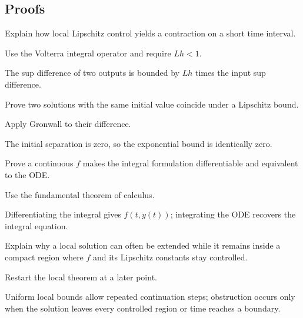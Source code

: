 \subsection*{Proofs}

\begin{exercise}\label{exr:ii19-expand-06}
Explain how local Lipschitz control yields a contraction on a short time interval.
\end{exercise}
\begin{hint}
Use the Volterra integral operator and require \(Lh<1\).
\end{hint}
\begin{solution}
The sup difference of two outputs is bounded by \(Lh\) times the input sup difference.
\end{solution}

\begin{exercise}\label{exr:ii19-expand-07}
Prove two solutions with the same initial value coincide under a Lipschitz bound.
\end{exercise}
\begin{hint}
Apply Gronwall to their difference.
\end{hint}
\begin{solution}
The initial separation is zero, so the exponential bound is identically zero.
\end{solution}

\begin{exercise}\label{exr:ii19-expand-08}
Prove a continuous \(f\) makes the integral formulation differentiable and equivalent to the ODE.
\end{exercise}
\begin{hint}
Use the fundamental theorem of calculus.
\end{hint}
\begin{solution}
Differentiating the integral gives \(f(t,y(t))\); integrating the ODE recovers the integral equation.
\end{solution}

\begin{exercise}\label{exr:ii19-expand-09}
Explain why a local solution can often be extended while it remains inside a compact region where \(f\) and its Lipschitz constants stay controlled.
\end{exercise}
\begin{hint}
Restart the local theorem at a later point.
\end{hint}
\begin{solution}
Uniform local bounds allow repeated continuation steps; obstruction occurs only when the solution leaves every controlled region or time reaches a boundary.
\end{solution}

